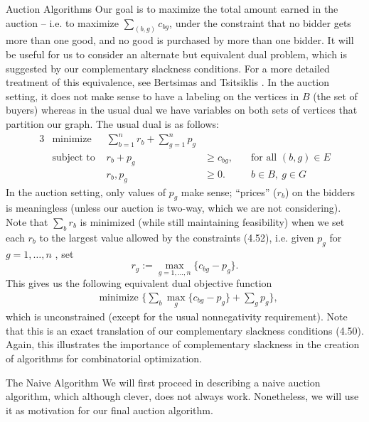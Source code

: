 \begin{section}{Auction Algorithms}
	Our goal is to maximize the total amount earned in the auction -- i.e. to 
	maximize $\sum_{(b,g)} c_{bg}$, under the constraint that no bidder gets more than one good, 
	and no good is purchased by more than one bidder.
	It will be useful for us to consider an alternate but equivalent dual problem, which is 
	suggested by our complementary slackness conditions. For a more detailed treatment of this 
	equivalence, see Bertsimas and Tsitsiklis \cite{bertsimas1997introduction}. 
	In the auction setting, it does not make 
	sense to have a labeling on the vertices in $B$ (the set of buyers) whereas in the usual dual we 
	have variables on both sets of vertices that partition our graph. The usual dual is as 
	follows:
	\begin{alignat}{3}
		& \text{minimize } & \sum_{b=1}^n r_b + \sum_{g=1}^n p_g & \\
		& \text{subject to } & r_b + p_g & \geq c_{bg}, &\quad \text{for all } (b,g)\in E\\
				     && r_b,p_g & \geq 0. & \quad b\in B,\ g\in G
	\end{alignat}
	In the auction setting, only 
	values of $p_g$ make sense; ``prices'' ($r_b$) on the bidders is meaningless (unless our 
	auction is two-way, which we are not considering). 
	Note that $\sum_b r_b$ is minimized (while still maintaining feasibility) when we set each 
	$r_b$ to the largest value allowed by the constraints (4.52), i.e. given $p_{g}$ for 
	$g=1, \dots, n$ , set
	\[
		r_{g} := \max_{g=1,\dots, n} \{c_{bg} - p_g\}.
	\]
	This gives us the following equivalent dual objective function 
	\begin{align}
		&\text{minimize }\{ \sum_b \max_g \{c_{bg} - p_g\} + \sum_g p_g\},
	\end{align}
	which is unconstrained (except for the usual nonnegativity requirement). 
	Note that this is an exact translation of our complementary slackness 
	conditions (4.50). Again, this illustrates the importance of complementary slackness in the 
	creation of algorithms for combinatorial optimization.

	\begin{subsection}{The Naive Algorithm}
		We will first proceed in describing a naive auction algorithm, which although clever, 
		does not always work. Nonetheless, we will use it as motivation for 
		our final auction algorithm.


\end{subsection}
\end{section}
